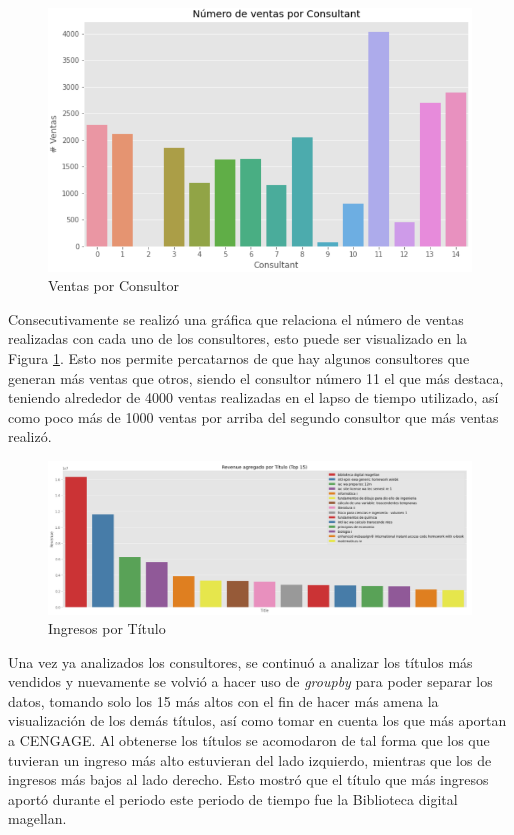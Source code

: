 \documentclass{article}
\begin{document}
        \begin{figure}[h!]
            \centering
            \includegraphics[width = \columnwidth]{img/num_sales_consultant.png}
            \caption{Ventas por Consultor}
            \label{fig:ventConsultor}
        \end{figure}

        Consecutivamente se realizó una gráfica que relaciona el número de ventas realizadas con cada uno de los consultores, esto puede ser visualizado en la Figura \ref{fig:ventConsultor}. Esto nos permite percatarnos de que hay algunos consultores que generan más ventas que otros, siendo el consultor número 11 el que más destaca, teniendo alrededor de 4000 ventas realizadas en el lapso de tiempo utilizado, así como poco más de 1000 ventas por arriba del segundo consultor que más ventas realizó.


        \begin{figure}[h!]
            \centering
            \includegraphics[width = \columnwidth]{img/revenue_title.png}
            \caption{Ingresos por Título}
            \label{fig:revTítulo}
        \end{figure}

        Una vez ya analizados los consultores, se continuó a analizar los títulos más vendidos y nuevamente se volvió a hacer uso de \emph{groupby} para poder separar los datos, tomando solo los 15 más altos con el fin de hacer más amena la visualización de los demás títulos, así como tomar en cuenta los que más aportan a CENGAGE. Al obtenerse los títulos se acomodaron de tal forma que los que tuvieran un ingreso más alto estuvieran del lado izquierdo, mientras que los de ingresos más bajos al lado derecho. Esto mostró que el título que más ingresos aportó durante el periodo este periodo de tiempo fue la Biblioteca digital magellan.
\end{document}

